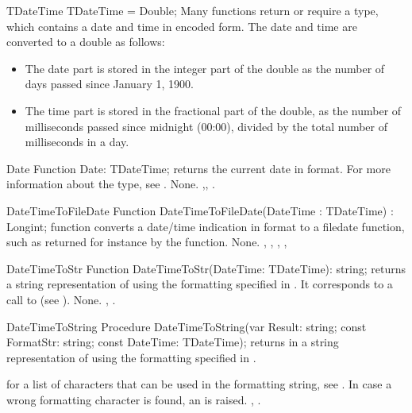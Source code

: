\begin{type}{TDateTime}
\Declaration
  TDateTime = Double;
\Description
Many functions return or require a  type, which contains
a date and time in encoded form. The date and time are converted to a double
as follows:
\begin{itemize}
\item The date part is stored in the integer part of the double as the
number of days passed since January 1, 1900.
\item The time part is stored in the fractional part of the double, as
the number of milliseconds passed since midnight (00:00), divided by the
total number of milliseconds in a day.
\end{itemize}
\end{type}

\begin{function}{Date}
\Declaration
Function Date: TDateTime;
\Description
{} returns the current date in  format.
For more information about the  type, see .
\Errors
None.
\SeeAlso
{},, .
\end{function}



\begin{function}{DateTimeToFileDate}
\Declaration
Function DateTimeToFileDate(DateTime : TDateTime) : Longint;
\Description
{} function converts a date/time indication in
 format to a filedate function, such as returned for
instance by the  function.
\Errors
None.
\SeeAlso
{}, , ,
, 
\end{function}



\begin{function}{DateTimeToStr}
\Declaration
Function DateTimeToStr(DateTime: TDateTime): string;
\Description
{} returns a string representation of
 using the formatting specified in
. It corresponds to a call to
 (see ).
\Errors
None.
\SeeAlso
{}, .
\end{function}



\begin{procedure}{DateTimeToString}
\Declaration
Procedure DateTimeToString(var Result: string; const FormatStr: string; const DateTime: TDateTime);
\Description
{} returns in  a string representation of
 using the formatting specified in .

for a list of characters that can be used in the  formatting
string, see .
\Errors
In case a wrong formatting character is found, an  is
raised.
\SeeAlso
{}, .
\end{procedure}

